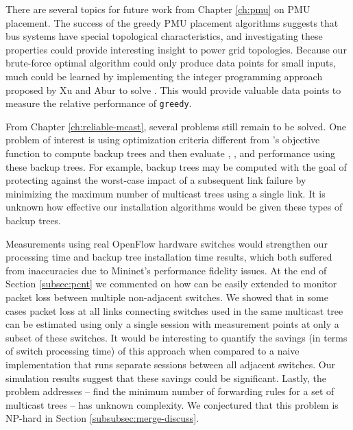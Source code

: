 
There are several topics for future work from Chapter \ref{ch:pmu} on PMU placement. The success of the greedy PMU placement algorithms suggests that bus systems have special topological characteristics,
and investigating these properties could provide interesting insight to power grid topologies. 
Because our brute-force optimal algorithm could only produce data points for small inputs, much could be learned by implementing  
the integer programming approach proposed by Xu and Abur \cite{Xu04} to solve \fulls.  This would provide valuable data points to measure the relative performance of {\tt greedy}.


From Chapter \ref{ch:reliable-mcast}, several problems still remain to be solved. One problem of interest is using optimization criteria different from \mcs's objective function 
to compute backup trees and then evaluate \pres, \posts, and \merge performance using these backup trees.  
For example, backup trees may be computed with the goal of protecting against the worst-case impact of a subsequent link failure
by minimizing the maximum number of multicast trees using a single link. %
It is unknown how effective our installation algorithms would be given these types of backup trees. %

Measurements using real OpenFlow hardware switches would strengthen our \pcnt processing time and backup tree installation time results, which both suffered from inaccuracies due to Mininet's
performance fidelity issues.  At the end of Section \ref{subsec:pcnt} we commented on how \pcnt can be easily extended to monitor packet loss between multiple non-adjacent switches.  We showed
that in some cases packet loss at all links connecting switches used in the same multicast tree can be estimated using only a single \pcnt session 
with measurement points at only a subset of these switches. It would be
interesting to quantify the savings (in terms of switch processing time) of this approach when compared to a naive implementation that runs separate \pcnt sessions between all adjacent switches.  Our 
\pcnt simulation results suggest that these savings could be significant. 
Lastly, the problem \merge addresses -- find the minimum number of forwarding rules for a set of multicast trees -- has unknown complexity.
We conjectured that this problem is NP-hard in Section \ref{subsubsec:merge-discuss}. %

